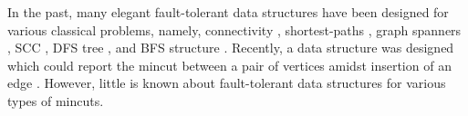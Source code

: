 


In the past, many elegant fault-tolerant data structures have been designed for various classical problems, namely,  connectivity \cite{DBLP:journals/algorithmica/FrigioniI00,DBLP:journals/siamcomp/ChanPR11,DBLP:conf/soda/DuanP17}, shortest-paths \cite{DBLP:conf/stoc/BernsteinK09,DBLP:journals/siamcomp/DemetrescuTCR08,DBLP:conf/stoc/ChechikC20}, graph spanners \cite{DBLP:journals/siamcomp/ChechikLPR10,DBLP:journals/tcs/BraunschvigCPS15}, SCC \cite{DBLP:journals/algorithmica/BaswanaCR19} , DFS tree \cite{DBLP:journals/siamcomp/BaswanaCC019}, and BFS structure \cite{DBLP:journals/talg/ParterP16,DBLP:journals/talg/ParterP18}. Recently, a data structure was designed which could report the mincut between a pair of vertices amidst insertion of an edge \cite{DBLP:conf/esa/BaswanaGK20}. However, little is known about fault-tolerant data structures for various types of mincuts.

